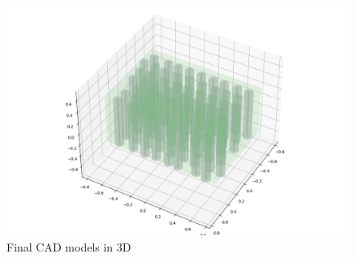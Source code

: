 \documentclass[11pt]{article}
\begin{document}
\begin{figure}
\centering
\includegraphics{./plots/CAD_models.png}
\caption{Final CAD models in 3D}
\end{figure}


    
    
    
\end{document}
